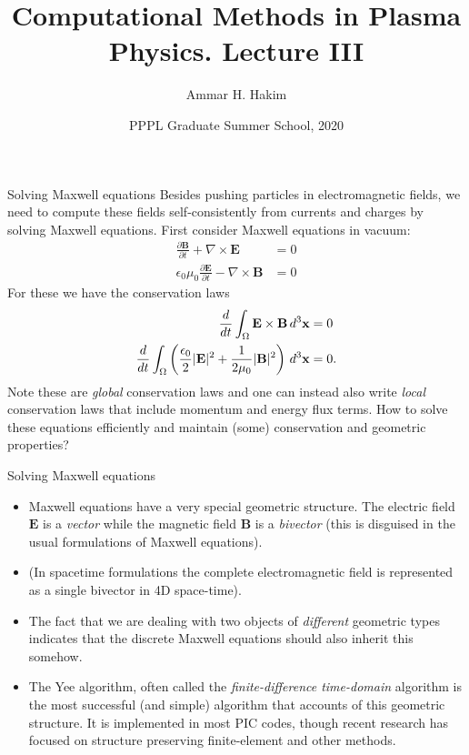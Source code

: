 \documentclass[pdf]{beamer}
\title[{\tt }] {Computational Methods in Plasma Physics. Lecture III}%
\author[http://cmpp.rtfd.io]%
{Ammar H. Hakim\inst{1}}%
\institute[PPPL]
{ \inst{1} Princeton Plasma Physics Laboratory, Princeton, NJ %
}
\date[8/12/2020]{PPPL Graduate Summer School, 2020}
\newcommand{\mvec}[1]{\mathbf{#1}}
\newcommand{\dtx}{\thinspace d^3\mvec{x}}
\theoremstyle{definition}
\begin{document}
\begin{frame}
  \titlepage
\end{frame}

\begin{frame}{Solving Maxwell equations}
  \small%
  Besides pushing particles in electromagnetic fields, we need to
  compute these fields self-consistently from currents and charges by
  solving Maxwell equations. First consider Maxwell equations in
  vacuum:
  \begin{align*}
    \frac{\partial \mvec{B}}{\partial t} + \nabla\times\mvec{E} &= 0 \\
    \epsilon_0\mu_0\frac{\partial \mvec{E}}{\partial t} -
    \nabla\times\mvec{B} &= 0
  \end{align*}
  For these we have the conservation laws
  \begin{align*}
    \frac{d}{dt} \int_\Omega \mvec{E}\times\mvec{B}  \dtx &= 0 \\
    \frac{d}{dt} \int_\Omega \left( \frac{\epsilon_0}{2} |\mvec{E}|^2 + \frac{1}{2\mu_0} |\mvec{B}|^2 \right) \dtx &= 0.
  \end{align*}
  Note these are \emph{global} conservation laws and one can instead
  also write \emph{local} conservation laws that include momentum and
  energy flux terms. How to solve these equations efficiently and
  maintain (some) conservation and geometric properties?
\end{frame}

\begin{frame}{Solving Maxwell equations}
  \begin{itemize}
  \item Maxwell equations have a very special geometric structure. The
    electric field $\mvec{E}$ is a \emph{vector} while the magnetic
    field $\mvec{B}$ is a \emph{bivector} (this is disguised in the
    usual formulations of Maxwell equations).
  \item (In spacetime formulations the complete electromagnetic field
    is represented as a single bivector in 4D space-time).
  \item The fact that we are dealing with two objects of
    \emph{different} geometric types indicates that the discrete
    Maxwell equations should also inherit this somehow.
  \item The Yee algorithm, often called the \emph{finite-difference
      time-domain} algorithm is the most successful (and simple)
    algorithm that accounts of this geometric structure. It is
    implemented in most PIC codes, though recent research has focused
    on structure preserving finite-element and other methods.
  \end{itemize}
\end{frame}
\end{document}
